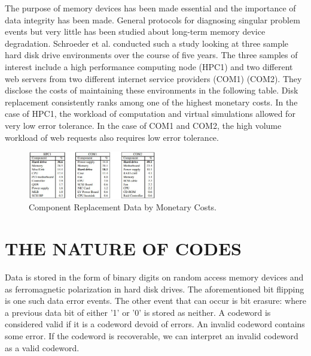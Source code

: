 \documentclass[letterpaper, 10 pt, conference]{ieeeconf}
\begin{document}
The purpose of memory devices has been made essential and the importance of data integrity has been made.  General protocols for diagnosing singular problem events but very little has been studied about long-term memory device degradation.  Schroeder et al. conducted such a study looking at three sample hard disk drive environments over the course of five years.  The three samples of interest include a high performance computing node (HPC1) and two different web servers from two different internet service providers (COM1) (COM2).  They disclose the costs of maintaining these environments in the following table.  Disk replacement consistently ranks among one of the highest monetary costs.  In the case of HPC1, the workload of computation and virtual simulations allowed for very low error tolerance.  In the case of COM1 and COM2, the high volume workload of web requests also requires low error tolerance.
\begin{figure}[!ht] %
	\centering
	\includegraphics [width=0.5\textwidth] {Component Replacement.JPG} 
    \caption{Component Replacement Data by Monetary Costs.\cite{MTTF Million}}

\end{figure}

\section{THE NATURE OF CODES}

Data is stored in the form of binary digits on random access memory devices and as ferromagnetic polarization in hard disk drives.  The aforementioned bit flipping is one such data error events.  The other event that can occur is bit erasure: where a previous data bit of either '1' or '0' is stored as neither.  A codeword is considered valid if it is a codeword devoid of errors.  An invalid codeword contains some error.  If the codeword is recoverable, we can interpret an invalid codeword as a valid codeword.
\end{document}
